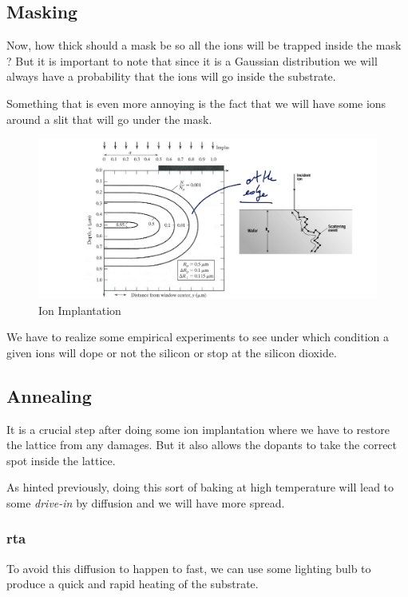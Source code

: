 \documentclass{report}
\begin{document}
\subsection{Masking}

Now, how thick should a mask be so all the ions will be trapped inside the mask ? But it is important to note that since it is a Gaussian distribution we will always have a probability that the ions will go inside the substrate. 

Something that is even more annoying is the fact that we will have some ions around a slit that will go under the mask.

\begin{figure}[H]
    \centering
    \includegraphics[width=0.75\linewidth]{implanatation.png}
    \caption{Ion Implantation}
    \label{fig:implantation-label}
\end{figure}

We have to realize some empirical experiments to see under which condition a given ions will dope or not the silicon or stop at the silicon dioxide.

\subsection{Annealing}

It is a crucial step after doing some ion implantation where we have to restore the lattice from any damages. But it also allows the dopants to take the correct spot inside the lattice.

As hinted previously, doing this sort of baking at high temperature will lead to some \textit{drive-in} by diffusion and we will have more spread.

\subsubsection{\gls{rta}}

To avoid this diffusion to happen to fast, we can use some lighting bulb to produce a quick and rapid heating of the substrate.
\end{document}
